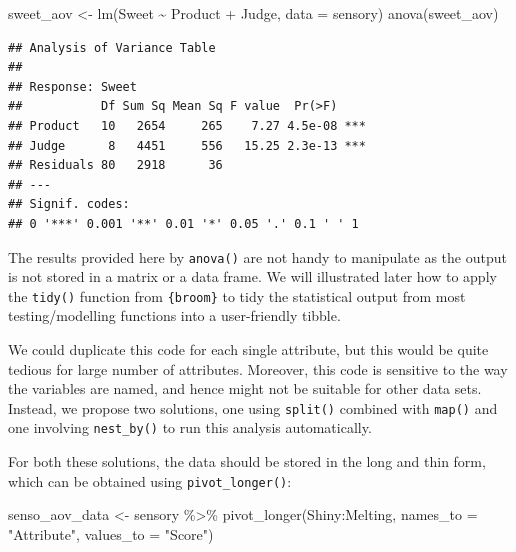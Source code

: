 \documentclass[
]{krantz}
\makeatletter
\newenvironment{Shaded}{\begin{snugshade}}{\end{snugshade}}
\newcommand{\AttributeTok}[1]{\textcolor[rgb]{0.61,0.61,0.61}{#1}}
\newcommand{\FunctionTok}[1]{\textcolor[rgb]{0,0,0}{#1}}
\newcommand{\NormalTok}[1]{#1}
\newcommand{\OtherTok}[1]{\textcolor[rgb]{0.37,0.37,0.37}{#1}}
\newcommand{\SpecialCharTok}[1]{\textcolor[rgb]{0,0,0}{#1}}
\newcommand{\StringTok}[1]{\textcolor[rgb]{0.5,0.5,0.5}{#1}}
\renewenvironment{quote}{\begin{VF}}{\end{VF}}
\newenvironment{kframe}{%
\medskip{}
\setlength{\fboxsep}{.8em}
 \def\at@end@of@kframe{}%
 \ifinner\ifhmode%
  \def\at@end@of@kframe{\end{minipage}}%
  \begin{minipage}{\columnwidth}%
 \fi\fi%
 \def\FrameCommand##1{\hskip\@totalleftmargin \hskip-\fboxsep
 \colorbox{shadecolor}{##1}\hskip-\fboxsep
     \hskip-\linewidth \hskip-\@totalleftmargin \hskip\columnwidth}%
 \MakeFramed {\advance\hsize-\width
   \@totalleftmargin\z@ \linewidth\hsize
   \@setminipage}}%
 {\par\unskip\endMakeFramed%
 \at@end@of@kframe}
\renewenvironment{Shaded}{\begin{kframe}}{\end{kframe}}
\makeatother
\begin{document}
\begin{Shaded}
\begin{Highlighting}[]
\NormalTok{sweet\_aov }\OtherTok{\textless{}{-}} \FunctionTok{lm}\NormalTok{(Sweet }\SpecialCharTok{\textasciitilde{}}\NormalTok{ Product }\SpecialCharTok{+}\NormalTok{ Judge, }\AttributeTok{data =}\NormalTok{ sensory)}
\FunctionTok{anova}\NormalTok{(sweet\_aov)}
\end{Highlighting}
\end{Shaded}

\begin{verbatim}
## Analysis of Variance Table
## 
## Response: Sweet
##           Df Sum Sq Mean Sq F value  Pr(>F)    
## Product   10   2654     265    7.27 4.5e-08 ***
## Judge      8   4451     556   15.25 2.3e-13 ***
## Residuals 80   2918      36                    
## ---
## Signif. codes:  
## 0 '***' 0.001 '**' 0.01 '*' 0.05 '.' 0.1 ' ' 1
\end{verbatim}

\begin{quote}
The results provided here by \texttt{anova()} are not handy to manipulate as the output is not stored in a matrix or a data frame. We will illustrated later how to apply the \texttt{tidy()} function from \texttt{\{broom\}} to tidy the statistical output from most testing/modelling functions into a user-friendly tibble.
\end{quote}

We could duplicate this code for each single attribute, but this would be quite tedious for large number of attributes. Moreover, this code is sensitive to the way the variables are named, and hence might not be suitable for other data sets. Instead, we propose two solutions, one using \texttt{split()} combined with \texttt{map()} and one involving \texttt{nest\_by()} to run this analysis automatically.

For both these solutions, the data should be stored in the long and thin form, which can be obtained using \texttt{pivot\_longer()}:

\begin{Shaded}
\begin{Highlighting}[]
\NormalTok{senso\_aov\_data }\OtherTok{\textless{}{-}}\NormalTok{ sensory }\SpecialCharTok{\%\textgreater{}\%}
  \FunctionTok{pivot\_longer}\NormalTok{(Shiny}\SpecialCharTok{:}\NormalTok{Melting, }
               \AttributeTok{names\_to =} \StringTok{"Attribute"}\NormalTok{, }\AttributeTok{values\_to =} \StringTok{"Score"}\NormalTok{)}
\end{Highlighting}
\end{Shaded}
\end{document}
